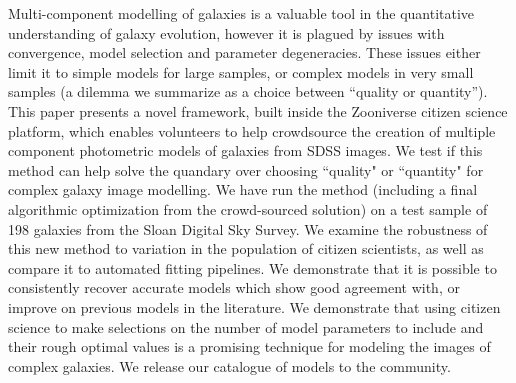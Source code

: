 \documentclass[../main.tex]{subfiles}
\begin{document}
Multi-component modelling of galaxies is a valuable tool in the quantitative understanding of galaxy evolution, however it is plagued by issues with convergence, model selection and parameter degeneracies. These issues either limit it to simple models for large samples, or complex models in very small samples  (a dilemma we summarize as a choice between “quality or quantity”). This paper presents a novel framework, built inside the Zooniverse citizen science platform, which enables volunteers to help crowdsource the creation of multiple component photometric models of galaxies from SDSS images. We test if this method can help solve the quandary over choosing ``quality" or ``quantity" for complex galaxy image modelling.
We have run the method (including a final algorithmic optimization from the crowd-sourced solution) on a test sample of 198 galaxies from the Sloan Digital Sky Survey. We examine the robustness of this new method to variation in the population of citizen scientists, as well as compare it to automated fitting pipelines. We demonstrate that it is possible to consistently recover accurate models which show good agreement with, or improve on previous models in the literature. We demonstrate that using citizen science to make selections on the number of model parameters to include and their rough optimal values is a promising technique for modeling the images of complex galaxies. We release our catalogue of models to the community.
\end{document}
